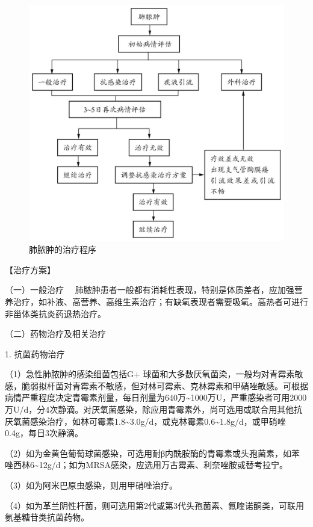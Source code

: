\begin{figure}[!htbp]
 \centering
 \includegraphics{./images/Image00021.jpg}
 \captionsetup{justification=centering}
 \caption{肺脓肿的治疗程序}
 \label{fig1-9-1}
  \end{figure} 

【治疗方案】

{（一）一般治疗}
　肺脓肿患者一般都有消耗性表现，特别是体质差者，应加强营养治疗，如补液、高营养、高维生素治疗；有缺氧表现者需要吸氧。高热者可进行非甾体类抗炎药退热治疗。

{（二）药物治疗及相关治疗}

1. 抗菌药物治疗

（1）急性肺脓肿的感染细菌包括G{+}
球菌和大多数厌氧菌染，一般均对青霉素敏感，脆弱拟杆菌对青霉素不敏感，但对林可霉素、克林霉素和甲硝唑敏感。可根据病情严重程度决定青霉素剂量，每日剂量为640万\textasciitilde{}1000万U，严重感染者可用2000万U/d，分4次静滴。对厌氧菌感染，除应用青霉素外，尚可选用或联合用其他抗厌氧菌感染治疗，如林可霉素1.8\textasciitilde{}3.0g/d，或克林霉素0.6\textasciitilde{}1.8g/d，或甲硝唑0.4g，每日3次静滴。

（2）如为金黄色葡萄球菌感染，可选用耐β内酰胺酶的青霉素或头孢菌素，如苯唑西林6\textasciitilde{}12g/d；如为MRSA感染，应选用万古霉素、利奈唑胺或替考拉宁。

（3）如为阿米巴原虫感染，则用甲硝唑治疗。

（4）如为革兰阴性杆菌，则可选用第2代或第3代头孢菌素、氟喹诺酮类，可联用氨基糖苷类抗菌药物。

